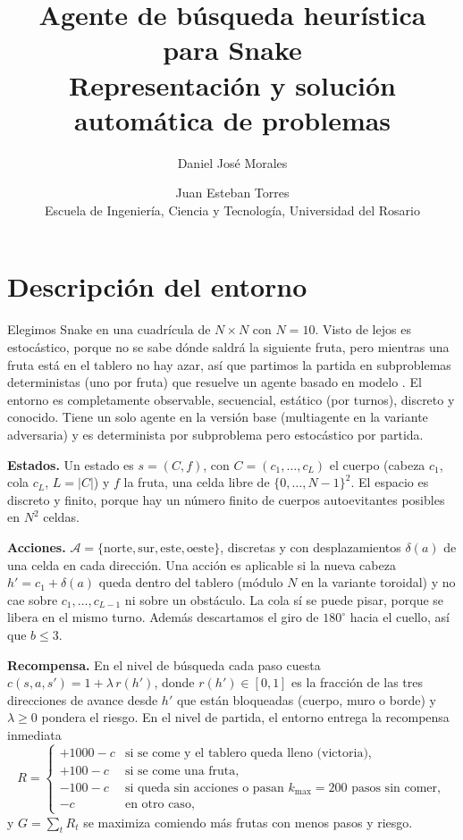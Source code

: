 \documentclass[11pt,letterpaper]{article}
\title{\vspace{-1.9cm}Agente de búsqueda heurística para Snake\\
\large Representación y solución automática de problemas}
\author{Daniel José Morales \and Juan Esteban Torres\\
\small Escuela de Ingeniería, Ciencia y Tecnología, Universidad del Rosario}
\date{}
\begin{document}
\maketitle
\vspace{-0.9cm}

\section{Descripción del entorno}

Elegimos Snake en una cuadrícula de $N\times N$ con $N=10$. Visto de lejos es estocástico, porque no se sabe dónde saldrá la siguiente fruta, pero mientras una fruta está en el tablero no hay azar, así que partimos la partida en subproblemas deterministas (uno por fruta) que resuelve un agente basado en modelo \cite{aima}. El entorno es completamente observable, secuencial, estático (por turnos), discreto y conocido. Tiene un solo agente en la versión base (multiagente en la variante adversaria) y es determinista por subproblema pero estocástico por partida.

\textbf{Estados.} Un estado es $s=(C,f)$, con $C=(c_1,\dots,c_L)$ el cuerpo (cabeza $c_1$, cola $c_L$, $L=|C|$) y $f$ la fruta, una celda libre de $\{0,\dots,N-1\}^2$. El espacio es discreto y finito, porque hay un número finito de cuerpos autoevitantes posibles en $N^2$ celdas.

\textbf{Acciones.} $\mathcal{A}=\{\text{norte},\text{sur},\text{este},\text{oeste}\}$, discretas y con desplazamientos $\delta(a)$ de una celda en cada dirección. Una acción es aplicable si la nueva cabeza $h'=c_1+\delta(a)$ queda dentro del tablero (módulo $N$ en la variante toroidal) y no cae sobre $c_1,\dots,c_{L-1}$ ni sobre un obstáculo. La cola sí se puede pisar, porque se libera en el mismo turno. Además descartamos el giro de $180^\circ$ hacia el cuello, así que $b\le 3$.

\textbf{Recompensa.} En el nivel de búsqueda cada paso cuesta $c(s,a,s')=1+\lambda\,r(h')$, donde $r(h')\in[0,1]$ es la fracción de las tres direcciones de avance desde $h'$ que están bloqueadas (cuerpo, muro o borde) y $\lambda\ge 0$ pondera el riesgo. En el nivel de partida, el entorno entrega la recompensa inmediata
\[
R=\begin{cases}
+1000-c & \text{si se come y el tablero queda lleno (victoria)},\\
+100-c & \text{si se come una fruta},\\
-100-c & \text{si queda sin acciones o pasan } k_{\max}=200 \text{ pasos sin comer},\\
-c & \text{en otro caso,}
\end{cases}
\]
y $G=\sum_t R_t$ se maximiza comiendo más frutas con menos pasos y riesgo.
\end{document}
